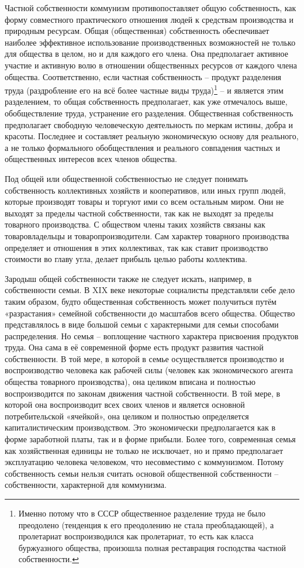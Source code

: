 \documentclass[../main]{subfiles}
\begin{document}
Частной собственности коммунизм противопоставляет общую собственность, как форму совместного практического отношения людей к средствам производства и природным ресурсам. Общая (общественная) собственность обеспечивает наиболее эффективное использование производственных возможностей не только для общества в целом, но и для каждого его члена. Она предполагает активное участие и активную волю в отношении общественных ресурсов от каждого члена общества. Соответственно, если частная собственность – продукт разделения труда (раздробление его на всё более частные виды труда)\footnote{Именно потому что в СССР общественное разделение труда не было преодолено (тенденция к его преодолению не стала преобладающей), а пролетариат воспроизводился как пролетариат, то есть как класса буржуазного общества, произошла полная реставрация господства частной собственности.} – и является этим разделением, то общая собственность предполагает, как уже отмечалось выше, обобществление труда, устранение его разделения. Общественная собственность предполагает свободную человеческую деятельность по меркам истины, добра и красоты. Последнее и составляет реальную экономическую основу для реального, а не только формального обобществления и реального совпадения частных и общественных интересов всех членов общества.

Под общей или общественной собственностью не следует понимать собственность коллективных хозяйств и кооперативов, или иных групп людей, которые производят товары и торгуют ими со всем остальным миром. Они не выходят за пределы частной собственности, так как не выходят за пределы товарного производства. С обществом члены таких хозяйств связаны как товаровладельцы и товаропроизводители. Сам характер товарного производства определяет и отношения в этих коллективах, так как ставит производство стоимости во главу угла, делает прибыль целью работы коллектива.

Зародыш общей собственности также не следует искать, например, в собственности семьи. В XIX веке некоторые социалисты представляли себе дело таким образом, будто общественная собственность может получиться путём «разрастания» семейной собственности до масштабов всего общества. Общество представлялось в виде большой семьи с характерными для семьи способами распределения. Но семья – воплощение частного характера присвоения продуктов труда. Она сама в её современной форме есть продукт развития частной собственности. В той мере, в которой в семье осуществляется производство и воспроизводство человека как рабочей силы (человек как экономического агента общества товарного производства), она целиком вписана и полностью воспроизводится по законам движения частной собственности. В той мере, в которой она воспроизводит всех своих членов и является основной потребительской «ячейкой», она целиком и полностью определяется капиталистическим производством. Это экономически предполагается как в форме заработной платы, так и в форме прибыли. Более того, современная семья как хозяйственная единицы не только не исключает, но и прямо предполагает эксплуатацию человека человеком, что несовместимо с коммунизмом. Потому собственность семьи нельзя считать основой общественной собственности – собственности, характерной для коммунизма.
\end{document}
